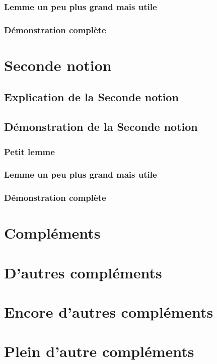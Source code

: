 \documentclass[a4paper,autre]{../texmf/tex/latex/insa/insa}
\begin{document}
				\subsubsection{Lemme un peu plus grand mais utile}
					\lipsum[1-4]
				\subsubsection{Démonstration complète}
					\lipsum[1-5]
		\section{Seconde notion}
			\lipsum[1-2]
			\subsection{Explication de la Seconde notion}
				\lipsum[1-5]
			\subsection{Démonstration de la Seconde notion}
				\subsubsection{Petit lemme}
					\lipsum[1-2]
				\subsubsection{Lemme un peu plus grand mais utile}
					\lipsum[1-4]
				\subsubsection{Démonstration complète}
					\lipsum[1-5]
	\begin{appendix}
	\section{Compléments}
		\lipsum[8-9]
		\section{D'autres compléments}
			\lipsum[52-56]
		\section{Encore d'autres compléments}
			\lipsum[68-92]
		\section{Plein d'autre compléments}
			\lipsum[105-109]
	\end{appendix}


	\makefourthcover
\end{document}
